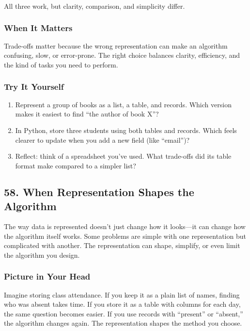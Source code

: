 \documentclass[
  letterpaper,
  DIV=11,
  numbers=noendperiod]{scrreprt}
\providecommand{\tightlist}{%
  \setlength{\itemsep}{0pt}\setlength{\parskip}{0pt}}
\begin{document}
All three work, but clarity, comparison, and simplicity differ.

\subsubsection{When It Matters}\label{when-it-matters-54}

Trade-offs matter because the wrong representation can make an algorithm
confusing, slow, or error-prone. The right choice balances clarity,
efficiency, and the kind of tasks you need to perform.

\subsubsection{Try It Yourself}\label{try-it-yourself-56}

\begin{enumerate}
\def\labelenumi{\arabic{enumi}.}
\tightlist
\item
  Represent a group of books as a list, a table, and records. Which
  version makes it easiest to find ``the author of book X''?
\item
  In Python, store three students using both tables and records. Which
  feels clearer to update when you add a new field (like ``email'')?
\item
  Reflect: think of a spreadsheet you've used. What trade-offs did its
  table format make compared to a simpler list?
\end{enumerate}

\subsection{58. When Representation Shapes the
Algorithm}\label{when-representation-shapes-the-algorithm}

The way data is represented doesn't just change how it looks---it can
change how the algorithm itself works. Some problems are simple with one
representation but complicated with another. The representation can
shape, simplify, or even limit the algorithm you design.

\subsubsection{Picture in Your Head}\label{picture-in-your-head-57}

Imagine storing class attendance. If you keep it as a plain list of
names, finding who was absent takes time. If you store it as a table
with columns for each day, the same question becomes easier. If you use
records with ``present'' or ``absent,'' the algorithm changes again. The
representation shapes the method you choose.
\end{document}
